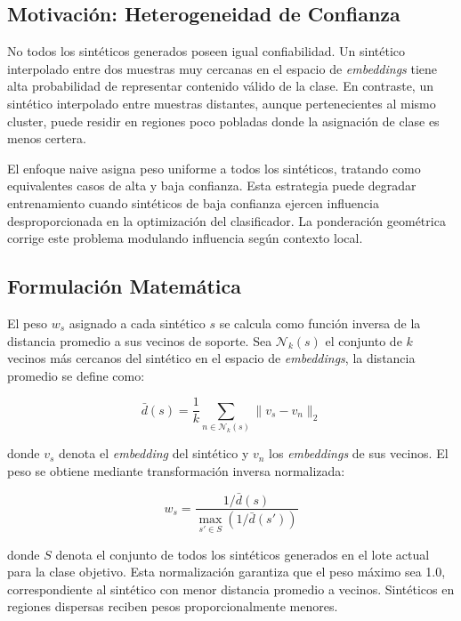 \subsection{Motivación: Heterogeneidad de Confianza}
\label{subsec:motivacion_ponderacion}

No todos los sintéticos generados poseen igual confiabilidad. Un sintético interpolado entre dos muestras muy cercanas en el espacio de \textit{embeddings} tiene alta probabilidad de representar contenido válido de la clase. En contraste, un sintético interpolado entre muestras distantes, aunque pertenecientes al mismo cluster, puede residir en regiones poco pobladas donde la asignación de clase es menos certera.

El enfoque naive asigna peso uniforme a todos los sintéticos, tratando como equivalentes casos de alta y baja confianza. Esta estrategia puede degradar entrenamiento cuando sintéticos de baja confianza ejercen influencia desproporcionada en la optimización del clasificador. La ponderación geométrica corrige este problema modulando influencia según contexto local.

\subsection{Formulación Matemática}
\label{subsec:formulacion_peso}

El peso $w_s$ asignado a cada sintético $s$ se calcula como función inversa de la distancia promedio a sus vecinos de soporte. Sea $\mathcal{N}_k(s)$ el conjunto de $k$ vecinos más cercanos del sintético en el espacio de \textit{embeddings}, la distancia promedio se define como:

\begin{equation}
\bar{d}(s) = \frac{1}{k} \sum_{n \in \mathcal{N}_k(s)} \|v_s - v_n\|_2
\end{equation}

donde $v_s$ denota el \textit{embedding} del sintético y $v_n$ los \textit{embeddings} de sus vecinos. El peso se obtiene mediante transformación inversa normalizada:

\begin{equation}
w_s = \frac{1/\bar{d}(s)}{\max_{s' \in S} (1/\bar{d}(s'))}
\label{eq:peso_geometrico}
\end{equation}

donde $S$ denota el conjunto de todos los sintéticos generados en el lote actual para la clase objetivo. Esta normalización garantiza que el peso máximo sea 1.0, correspondiente al sintético con menor distancia promedio a vecinos. Sintéticos en regiones dispersas reciben pesos proporcionalmente menores.

